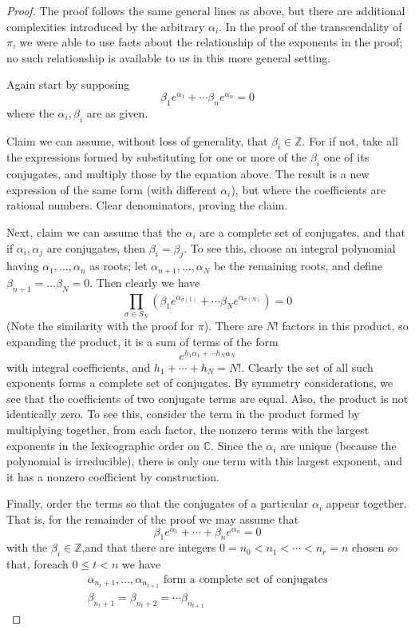 \documentclass[12pt]{article}
\newcommand{\Ints}{\mathbb{Z}}
\newcommand{\Complex}{\mathbb{C}}
\begin{document}
\begin{proof}
The proof follows the same general lines as above, but there are additional complexities introduced by the arbitrary $\alpha_i$. In the proof of the transcendality of $\pi$, we were able to use facts about the relationship of the exponents in the proof; no such relationship is available to us in this more general setting.

Again start by supposing
\begin{equation}\label{five}
\beta_1 e^{\alpha_1}+\cdots\beta_n e^{\alpha_n}= 0
\end{equation}
where the $\alpha_i, \beta_i$ are as given. 

Claim we can assume, without loss of generality, that $\beta_i\in\Ints$. For if not, take all the expressions formed by substituting for one or more of the $\beta_i$ one of its conjugates, and multiply those by the equation above. The result is a new expression of the same form (with different $\alpha_i$), but where the coefficients are rational numbers. Clear denominators, proving the claim.

Next, claim we can assume that the $\alpha_i$ are a complete set of conjugates, and that if $\alpha_i, \alpha_j$ are conjugates, then $\beta_i=\beta_j$. To see this, choose an  integral polynomial having $\alpha_1,\ldots,\alpha_n$ as roots; let $\alpha_{n+1},\ldots,\alpha_N$ be the remaining roots, and define $\beta_{n+1}=\ldots\beta_N=0$. Then clearly we have
\[\prod_{\sigma\in S_N}\left(\beta_1 e^{\alpha_{\sigma(1)}} + \cdots \beta_N e^{\alpha_{\sigma(N)}}\right)=0\]
(Note the similarity with the proof for $\pi$). There are $N!$ factors in this product, so expanding the product, it is a sum of terms of the form
\[e^{h_1\alpha_1+\cdots h_N\alpha_N}\]
with integral coefficients, and $h_1+\cdots+h_N=N!$. Clearly the set of all such exponents forms a complete set of conjugates. By symmetry considerations, we see that the coefficients of two conjugate terms are equal. Also, the product is not identically zero. To see this, consider the term in the product formed by multiplying together, from each factor, the nonzero terms with the largest exponents in the lexicographic order on $\Complex$. Since the $\alpha_i$ are unique (because the polynomial is irreducible), there is only one term with this largest exponent, and it has a nonzero coefficient by construction.

Finally, order the terms so that the conjugates of a particular $\alpha_i$ appear together. That is, for the remainder of the proof we may assume that
\[\beta_1 e^{\alpha_1} + \cdots + \beta_n e^{\alpha_n}=0\]
with the $\beta_i\in\Ints$,and that there are integers $0=n_0 < n_1 < \cdots < n_r=n$ chosen so that, foreach $0\leq t<n$ we have
\begin{gather*}
\alpha_{n_t+1},\ldots,\alpha_{n_{t+1}}\text{ form a complete set of conjugates}\\
\beta_{n_t+1} = \beta_{n_t+2} = \cdots \beta_{n_{t+1}}
\end{gather*}


\end{proof}
\end{document}
